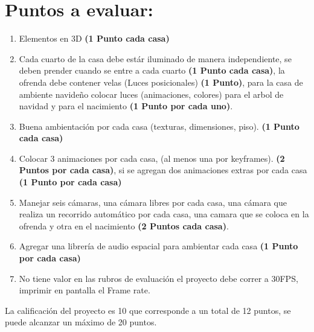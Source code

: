 \documentclass[12pt,letterpaper]{article}
\begin{document}
\section*{Puntos a evaluar:}
\begin{enumerate}
\item Elementos en 3D \textbf{(1 Punto cada casa)}
\item Cada cuarto de la casa debe estár iluminado de manera independiente, se deben prender cuando se entre a cada cuarto \textbf{(1 Punto cada casa)}, la ofrenda debe contener velas (Luces posicionales) \textbf{(1 Punto)}, para la casa de ambiente navideño colocar luces (animaciones, colores) para el arbol de navidad y para el nacimiento \textbf{(1 Punto por cada uno)}.
\item Buena ambientación por cada casa (texturas, dimensiones, piso). \textbf{(1 Punto cada casa)}
\item Colocar 3 animaciones por cada casa, (al menos una por keyframes). \textbf{(2 Puntos por cada casa)}, si se agregan dos animaciones extras por cada casa \textbf{(1 Punto por cada casa)}
\item Manejar seis cámaras, una cámara libres por cada casa, una cámara que realiza un recorrido automático por cada casa, una camara que se coloca en la ofrenda y otra en el nacimiento \textbf{(2 Puntos cada casa)}.
\item Agregar una librería de audio espacial para ambientar cada casa \textbf{(1 Punto por cada casa)}
\item No tiene valor en las rubros de evaluación el proyecto debe correr a 30FPS, imprimir en pantalla el Frame rate.
\end{enumerate}

La calificación del proyecto es 10 que corresponde a un total de 12 puntos, se puede alcanzar un máximo de 20 puntos.
\end{document}
